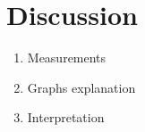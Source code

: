 \section{Discussion}

\begin{enumerate}
  \item Measurements
  \item Graphs
  \subitem explanation
  \item Interpretation
\end{enumerate}
